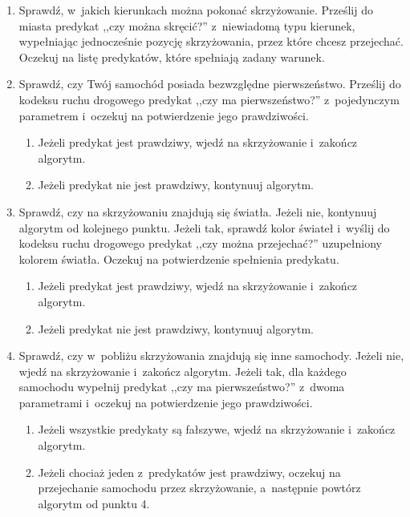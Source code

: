 \documentclass[a4paper,11pt]{article}
\begin{document}
\begin{enumerate}
    \item Sprawdź, w~jakich kierunkach można pokonać skrzyżowanie. Prześlij do miasta predykat ,,czy można skręcić?'' z~niewiadomą typu kierunek, wypełniając jednocześnie pozycję skrzyżowania, przez które chcesz przejechać. Oczekuj na listę predykatów, które spełniają zadany warunek.
    \item Sprawdź, czy Twój samochód posiada bezwzględne pierwszeństwo. Prześlij do kodeksu ruchu drogowego predykat ,,czy ma pierwszeństwo?'' z~pojedynczym parametrem i~oczekuj na potwierdzenie jego prawdziwości.

        \begin{enumerate}
            \item Jeżeli predykat jest prawdziwy, wjedź na skrzyżowanie i~zakończ algorytm.
            \item Jeżeli predykat nie jest prawdziwy, kontynuuj algorytm.
        \end{enumerate}

    \item Sprawdź, czy na skrzyżowaniu znajdują się światła. Jeżeli nie, kontynuuj algorytm od kolejnego punktu. Jeżeli tak, sprawdź kolor świateł i~wyślij do kodeksu ruchu drogowego predykat ,,czy można przejechać?'' uzupełniony kolorem światła. Oczekuj na potwierdzenie spełnienia predykatu.

        \begin{enumerate}
            \item Jeżeli predykat jest prawdziwy, wjedź na skrzyżowanie i~zakończ algorytm.
            \item Jeżeli predykat nie jest prawdziwy, kontynuuj algorytm.
        \end{enumerate}

    \item Sprawdź, czy w~pobliżu skrzyżowania znajdują się inne samochody. Jeżeli nie, wjedź na skrzyżowanie i~zakończ algorytm. Jeżeli tak, dla każdego samochodu wypełnij predykat ,,czy ma pierwszeństwo?'' z~dwoma parametrami i~oczekuj na potwierdzenie jego prawdziwości.

        \begin{enumerate}
            \item Jeżeli wszystkie predykaty są fałszywe, wjedź na skrzyżowanie i~zakończ algorytm.
            \item Jeżeli chociaż jeden z~predykatów jest prawdziwy, oczekuj na przejechanie samochodu przez skrzyżowanie, a~następnie powtórz algorytm od punktu 4.
        \end{enumerate}
\end{enumerate}
\end{document}
